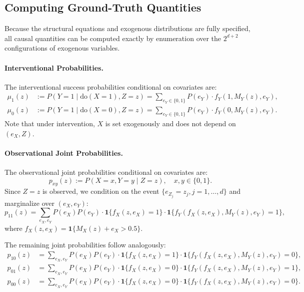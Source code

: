 \documentclass[accepted]{uai2026} %
\theoremstyle{plain}
\theoremstyle{definition}
\theoremstyle{remark}
\begin{document}
\subsection{Computing Ground-Truth Quantities}
\label{app:dgp:ground_truth}

Because the structural equations and exogenous distributions are fully specified, all causal quantities can be computed exactly by enumeration over the $2^{d+2}$ configurations of exogenous variables.

\paragraph{Interventional Probabilities.}
The interventional success probabilities conditional on covariates are:
\begin{align}
\mu_1(z) &:= P(Y = 1 \mid \text{do}(X = 1), Z = z) = \sum_{e_Y \in \{0,1\}} P(e_Y) \cdot f_Y(1, M_Y(z), e_Y), \\
\mu_0(z) &:= P(Y = 1 \mid \text{do}(X = 0), Z = z) = \sum_{e_Y \in \{0,1\}} P(e_Y) \cdot f_Y(0, M_Y(z), e_Y).
\end{align}
Note that under intervention, $X$ is set exogenously and does not depend on $(e_X, Z)$.

\paragraph{Observational Joint Probabilities.}
The observational joint probabilities conditional on covariates are:
\begin{equation}
p_{xy}(z) := P(X = x, Y = y \mid Z = z), \quad x, y \in \{0,1\}.
\end{equation}
Since $Z = z$ is observed, we condition on the event $\{e_{Z_j} = z_j, j = 1, \ldots, d\}$ and marginalize over $(e_X, e_Y)$:
\begin{equation}
p_{11}(z) = \sum_{e_X, e_Y} P(e_X) P(e_Y) \cdot \mathbf{1}\{f_X(z, e_X) = 1\} \cdot \mathbf{1}\{f_Y(f_X(z, e_X), M_Y(z), e_Y) = 1\},
\end{equation}
where $f_X(z, e_X) = \mathbf{1}\{M_X(z) + e_X > 0.5\}$.

The remaining joint probabilities follow analogously:
\begin{align}
p_{10}(z) &= \sum_{e_X, e_Y} P(e_X) P(e_Y) \cdot \mathbf{1}\{f_X(z, e_X) = 1\} \cdot \mathbf{1}\{f_Y(f_X(z, e_X), M_Y(z), e_Y) = 0\}, \\
p_{01}(z) &= \sum_{e_X, e_Y} P(e_X) P(e_Y) \cdot \mathbf{1}\{f_X(z, e_X) = 0\} \cdot \mathbf{1}\{f_Y(f_X(z, e_X), M_Y(z), e_Y) = 1\}, \\
p_{00}(z) &= \sum_{e_X, e_Y} P(e_X) P(e_Y) \cdot \mathbf{1}\{f_X(z, e_X) = 0\} \cdot \mathbf{1}\{f_Y(f_X(z, e_X), M_Y(z), e_Y) = 0\}.
\end{align}
\end{document}

